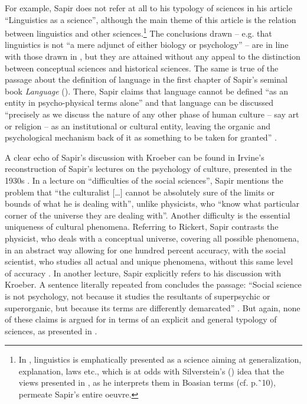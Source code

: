 \documentclass[output=paper]{langscibook}
\begin{document}
For example, Sapir does not refer at all to his typology of sciences in his \citeyear{Sapir1929} article ``Linguistics as a science'', although the main theme of this article is the relation between linguistics and other sciences.\footnote{In \citet{Sapir1929}, linguistics is emphatically presented as a science aiming at generalization, explanation, laws etc., which is at odds with Silverstein’s (\citeyear{Silverstein1986}) idea that the views presented in \citet{Sapir1917}, as he interprets them in Boasian terms (cf. p.˜10), permeate Sapir's entire oeuvre.}  The conclusions drawn -- e.g. that linguistics is not ``a mere adjunct of either biology or psychology'' \citep[214]{Sapir1929} -- are in line with those drawn in \citeyear{Sapir1917}, but they are attained without any appeal to the distinction between conceptual sciences and historical sciences. The same is true of the passage about the definition of language in the first chapter of Sapir's seminal book \emph{Language} (\citeyear{Sapir1921}). There, Sapir claims that language cannot be defined ``as an entity in psycho-physical terms alone'' and that language can be discussed ``precisely as we discuss the nature of any other phase of human culture -- say art or religion -- as an institutional or cultural entity, leaving the organic and psychological mechanism back of it as something to be taken for granted'' \citep[10--11]{Sapir1921}.\label{q:elffers:huminst}

A clear echo of Sapir's discussion with Kroeber can be found in Irvine's reconstruction of Sapir's lectures on the psychology of culture, presented in the 1930s \citep{Sapir1994}. In a lecture on ``difficulties of the social sciences'', Sapir mentions the problem that ``the culturalist […] cannot be absolutely sure of the limits or bounds of what he is dealing with'', unlike physicists, who ``know what particular corner of the universe they are dealing with''. Another difficulty is the essential uniqueness of cultural phenomena. Referring to Rickert, Sapir contrasts the physicist, who deals with a conceptual universe, covering all possible phenomena, in an abstract way allowing for one hundred percent accuracy, with the social scientist, who studies all actual and unique phenomena, without this same level of accuracy \citep[56--57]{Sapir1994}. In another lecture, Sapir explicitly refers to his discussion with Kroeber. A sentence literally repeated from \citet[444]{Sapir1917} concludes the passage: ``Social science is not psychology, not because it studies the resultants of superpsychic or superorganic, but because its terms are differently demarcated'' \citep[245]{Sapir1994}. But again, none of these claims is argued for in terms of an explicit and general typology of sciences, as presented in \citet{Sapir1917}.
\end{document}
